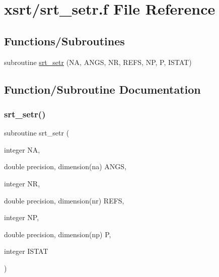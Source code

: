 \hypertarget{srt__setr_8f}{}\section{xsrt/srt\+\_\+setr.f File Reference}
\label{srt__setr_8f}
\subsection*{Functions/\+Subroutines}
\begin{DoxyCompactItemize}
\item 
subroutine \hyperlink{srt__setr_8f_ad9470f02453895cd91034cf1338fa072}{srt\+\_\+setr} (NA, A\+N\+GS, NR, R\+E\+FS, NP, P, I\+S\+T\+AT)
\end{DoxyCompactItemize}


\subsection{Function/\+Subroutine Documentation}
\mbox{\label{srt__setr_8f_ad9470f02453895cd91034cf1338fa072}} 
\subsubsection{\texorpdfstring{srt\+\_\+setr()}{srt\_setr()}}
{\footnotesize\ttfamily subroutine srt\+\_\+setr (\begin{DoxyParamCaption}\item[{integer}]{NA,  }\item[{double precision, dimension(na)}]{A\+N\+GS,  }\item[{integer}]{NR,  }\item[{double precision, dimension(nr)}]{R\+E\+FS,  }\item[{integer}]{NP,  }\item[{double precision, dimension(np)}]{P,  }\item[{integer}]{I\+S\+T\+AT }\end{DoxyParamCaption})}

